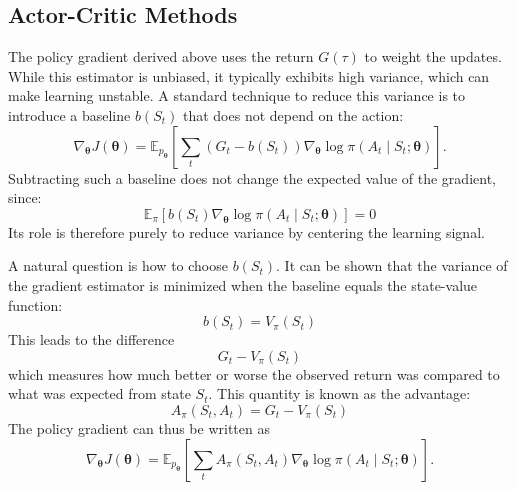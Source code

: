 \subsection{Actor-Critic Methods}

The policy gradient derived above uses the return $G(\tau)$ to weight the updates. While this estimator is unbiased, it typically exhibits high variance, which can make learning unstable. A standard technique to reduce this variance is to introduce a baseline $b(S_t)$ that does not depend on the action:
\begin{equation}
\nabla_{\boldsymbol{\theta}} J(\boldsymbol{\theta})
= \mathbb{E}_{p_{\boldsymbol{\theta}}} \left[
\sum_t \left( G_t - b(S_t) \right)
\nabla_{\boldsymbol{\theta}} \log \pi(A_t \mid S_t; \boldsymbol{\theta})
\right].
\end{equation}
Subtracting such a baseline does not change the expected value of the gradient, since:
\begin{equation}
\mathbb{E}_{\pi} \left[
b(S_t) \nabla_{\boldsymbol{\theta}} \log \pi(A_t \mid S_t; \boldsymbol{\theta})
\right] = 0
\end{equation}
Its role is therefore purely to reduce variance by centering the learning signal.

A natural question is how to choose $b(S_t)$. It can be shown that the variance of the gradient estimator is minimized when the baseline equals the state-value function:
\begin{equation}
b(S_t) = V_\pi(S_t)
\end{equation}
This leads to the difference
\begin{equation}
G_t - V_\pi(S_t)
\end{equation}
which measures how much better or worse the observed return was compared to what was expected from state $S_t$. This quantity is known as the advantage:
\begin{equation}
A_\pi(S_t, A_t) = G_t - V_\pi(S_t)
\end{equation}
The policy gradient can thus be written as
\begin{equation}
\nabla_{\boldsymbol{\theta}} J(\boldsymbol{\theta})
= \mathbb{E}_{p_{\boldsymbol{\theta}}} \left[
\sum_t A_\pi(S_t, A_t)
\nabla_{\boldsymbol{\theta}} \log \pi(A_t \mid S_t; \boldsymbol{\theta})
\right].
\end{equation}

